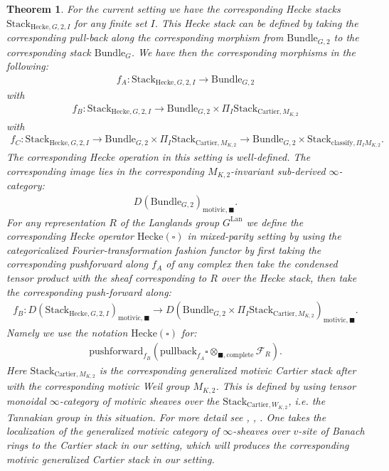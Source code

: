 \documentclass[12pt]{book}
\newtheorem{theorem}{Theorem}
\theoremstyle{definition}
\begin{document}
\begin{theorem}
For the current setting we have the corresponding Hecke stacks $\mathrm{Stack}_{\mathrm{Hecke},G,2,I}$ for any finite set $I$. This Hecke stack can be defined by taking the corresponding pull-back along the corresponding morphism from $\mathrm{Bundle}_{G,2}$ to the corresponding stack $\mathrm{Bundle}_{G}$. We have then the corresponding morphisms in the following:
\begin{align}
f_A: \mathrm{Stack}_{\mathrm{Hecke},G,2,I} \rightarrow \mathrm{Bundle}_{G,2}
\end{align}
with
\begin{align}
f_B: \mathrm{Stack}_{\mathrm{Hecke},G,2,I} \rightarrow \mathrm{Bundle}_{G,2}\times \Pi_I \mathrm{Stack}_{\mathrm{Cartier},M_{K,2}}
\end{align}
with
\begin{align}
f_C: \mathrm{Stack}_{\mathrm{Hecke},G,2,I} \rightarrow \mathrm{Bundle}_{G,2}\times \Pi_I \mathrm{Stack}_{\mathrm{Cartier},M_{K,2}}\rightarrow \mathrm{Bundle}_{G,2}\times \mathrm{Stack}_{\mathrm{classify},\Pi_I M_{K,2}}.
\end{align}
The corresponding Hecke operation in this setting is well-defined. The corresponding image lies in the corresponding $M_{K,2}$-invariant sub-derived $\infty$-category:
\begin{align}
D(\mathrm{Bundle}_{G,2})_{\text{motivic},\blacksquare}.
\end{align}
For any representation $R$ of the Langlands group $G^\mathrm{Lan}$ we define the corresponding Hecke operator $\mathrm{Hecke}(\square)$ in mixed-parity setting by using the categoricalized Fourier-transformation fashion functor by first taking the corresponding pushforward along $f_A$ of any complex then take the condensed tensor product with the sheaf corresponding to $R$ over the Hecke stack, then take the corresponding push-forward along:
\begin{align}
f_B: D(\mathrm{Stack}_{\mathrm{Hecke},G,2,I})_{\text{motivic},\blacksquare} \rightarrow D(\mathrm{Bundle}_{G,2}\times \Pi_I \mathrm{Stack}_{\mathrm{Cartier},M_{K,2}})_{\text{motivic},\blacksquare}.
\end{align}
Namely we use the notation $\mathrm{Hecke}(\square)$ for:
\begin{align}
\mathrm{pushforward}_{f_B}(\mathrm{pullback}_{f_A}\square\otimes_{\blacksquare,\mathrm{complete}}\mathcal{F}_R).
\end{align}
Here $\mathrm{Stack}_{\mathrm{Cartier},M_{K,2}}$ is the corresponding generalized motivic Cartier stack after \cite{Scho1} with the corresponding motivic Weil group $M_{K,2}$. This is defined by using tensor monoidal $\infty$-category of motivic sheaves over the $\mathrm{Stack}_{\mathrm{Cartier},W_{K,2}}$, i.e. the Tannakian group in this situation. For more detail see \cite{A2}, \cite{A3}, \cite{A4}. One takes the localization of the generalized motivic category of $\infty$-sheaves over $v$-site of Banach rings to the Cartier stack in our setting, which will produces the corresponding motivic generalized Cartier stack in our setting.
\end{theorem}
\end{document}

